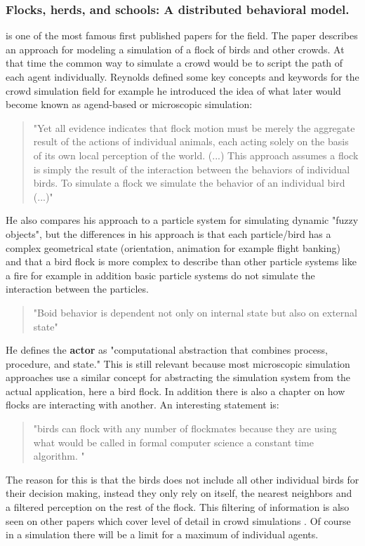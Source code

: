 \documentclass[sigconf]{acmart}
\begin{document}
\subsubsection{Flocks, herds, and schools: A distributed behavioral model.}\cite{reynolds_flocks_1987}
is one of the most famous first published papers for the field. The paper describes an approach for modeling a simulation of a flock of birds and other crowds. At that time the common way to simulate a crowd would be to script the path of each agent individually. Reynolds defined some key concepts and keywords for the crowd simulation field for example he introduced the idea of what later would become known as agend-based or microscopic simulation:
\begin{quote}
"Yet all evidence indicates that flock motion must be merely the aggregate result of the actions of individual animals, each acting solely on the basis of its own local perception of the world. (...) This approach assumes a flock is simply the result of the interaction between the behaviors of individual birds. To simulate a flock we simulate the behavior of an individual bird (...)"
\end{quote}
He also compares his approach to a particle system for simulating dynamic "fuzzy objects", but the differences in his approach is that each particle/bird has a complex geometrical state (orientation, animation for example flight banking) and that a bird flock is more complex to describe than other particle systems like a fire for example in addition basic particle systems do not simulate the interaction between the particles.  
\begin{quote}
"Boid behavior is dependent not only on internal state but also on external state"
\end{quote}
He defines the \textbf{actor} as "computational abstraction that combines process, procedure, and state." This is still relevant because most microscopic simulation approaches use a similar concept for abstracting the simulation system from the actual application, here a bird flock.  
In addition there is also a chapter on how flocks are interacting with another. An interesting statement is: 
\begin{quote}
"birds can flock with any number of flockmates because they are using what would be called in formal computer science a constant time algorithm. "
\end{quote}
The reason for this is that the birds does not include all other individual birds for their decision making, instead they only rely on itself, the nearest neighbors and a filtered perception on the rest of the flock. This  filtering of  information is also seen on other papers which cover level of detail in crowd simulations \cite{osullivan_levels_2002}. Of course in a simulation there will be a limit for a maximum of individual agents. 
\end{document}
